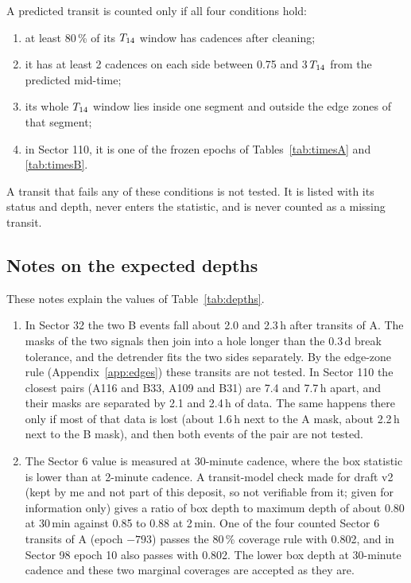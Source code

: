 A predicted transit is counted only if all four conditions hold:
\begin{enumerate}[label=(\roman*)]
\item at least 80\,\% of its $T_{14}$ window has cadences after cleaning;
\item it has at least 2 cadences on each side between 0.75 and 3\,$T_{14}$ from the predicted mid-time;
\item its whole $T_{14}$ window lies inside one segment and outside the edge zones of that segment;
\item in Sector 110, it is one of the frozen epochs of Tables~\ref{tab:timesA} and \ref{tab:timesB}.
\end{enumerate}
A transit that fails any of these conditions is not tested. It is listed with its status and depth, never enters the
statistic, and is never counted as a missing transit.


\subsection{Notes on the expected depths} \label{app:depthnotes}

These notes explain the values of Table~\ref{tab:depths}.
\begin{enumerate}
\item In Sector 32 the two B events fall about 2.0 and 2.3\,h after transits of A. The masks of the two signals then
  join into a hole longer than the 0.3\,d break tolerance, and the detrender fits the two sides separately. By the
  edge-zone rule (Appendix~\ref{app:edges}) these transits are not tested. In Sector 110 the closest pairs (A116 and
  B33, A109 and B31) are 7.4 and 7.7\,h apart, and their masks are separated by 2.1 and 2.4\,h of data. The same
  happens there only if most of that data is lost (about 1.6\,h next to the A mask, about 2.2\,h next to the B mask),
  and then both events of the pair are not tested.
\item The Sector 6 value is measured at 30-minute cadence, where the box statistic is lower than at 2-minute cadence. A
  transit-model check made for draft v2 (kept by me and not part of this deposit, so not verifiable from it; given for information only) gives a ratio of box depth to
  maximum depth of about 0.80 at 30\,min against 0.85 to 0.88 at 2\,min. One of the four counted Sector 6 transits of A
  (epoch $-793$) passes the 80\,\% coverage rule with 0.802, and in Sector 98 epoch 10 also passes with 0.802. The lower box
  depth at 30-minute cadence and these two marginal coverages are accepted as they are.
\end{enumerate}
